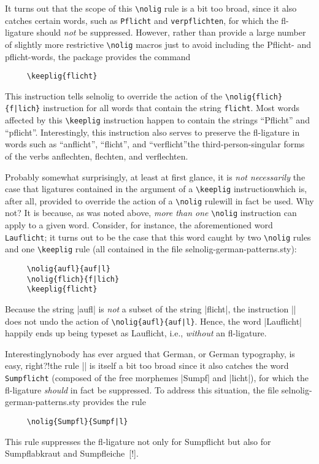 \documentclass[11pt]{article}
\newcommand{\pkg}[1]{\textsf{#1}}
\newcommand{\opt}[1]{\texttt{#1}}
\newcommand{\cmmd}[1]{\texttt{\textbackslash #1}}
\begin{document}
It turns out that the scope of this \cmmd{nolig} rule is a bit too broad, since it also catches certain words, such as \opt{Pflicht} and \opt{verpflichten}, for which the fl-ligature should \emph{not} be suppressed. However, rather than provide a large number of slightly more restrictive \cmmd{nolig} macros just to avoid including the Pflicht- and pflicht-words, the package provides the command
\begin{Verbatim}
     \keeplig{flicht}
\end{Verbatim}
This instruction tells \pkg{selnolig} to override the action of the \Verb+\nolig{flich}{f|lich}+ instruction for all words that contain the string \opt{flicht}. Most words affected by this \cmmd{keeplig} instruction happen to contain the strings \enquote{Pflicht} and \enquote{pflicht}. Interestingly, this instruction also serves to preserve the fl-ligature in words such as \enquote{anflicht}, \enquote{flicht}, and \enquote{verflicht}\textemdash the third-person-singular forms of the verbs anflechten, flechten, and verflechten. 

Probably somewhat surprisingly, at least at first glance, it is \emph{not necessarily} the case that ligatures contained in the argument of a \cmmd{keeplig} instruction\textemdash which is, after all, provided to override the action of a \cmmd{nolig} rule\textemdash will in fact be used. Why not? It is because, as was noted above, \emph{more than one} \cmmd{nolig} instruction can apply to a given word. Consider, for instance, the aforementioned word \opt{Lauflicht}; it turns out to be the case that this word caught by two \cmmd{nolig} rules and one \cmmd{keeplig} rule (all contained in the file \pkg{selnolig-german-patterns.sty}):
\begin{Verbatim}
     \nolig{aufl}{auf|l}
     \nolig{flich}{f|lich}
     \keeplig{flicht}
\end{Verbatim}
Because the string |aufl| is \emph{not} a subset of the string |flicht|, the instruction || does not undo the action of \Verb+\nolig{aufl}{auf|l}+. Hence, the word |Lauflicht| happily ends up being typeset as Lauflicht, i.e., \emph{without} an fl-ligature. 

Interestingly\textemdash nobody has ever argued that German, or German typography, is easy, right?!\textemdash\breaklig{}the rule  || is itself a bit too broad since it also catches the word \opt{Sumpf\-licht} (composed of the free morphemes |Sumpf| and |licht|), for which the fl-ligature \emph{should} in fact be suppressed. To address this situation, the file \pkg{selnolig-german-patterns.sty} provides the rule 
\begin{Verbatim}
     \nolig{Sumpfl}{Sumpf|l}
\end{Verbatim}
This rule suppresses the fl-ligature not only for Sumpflicht but also for Sumpflabkraut and Sumpfleiche~[!].
\end{document}
